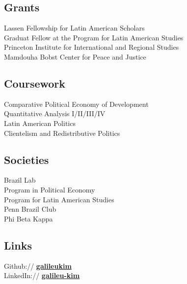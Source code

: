 \documentclass[]{deedy-resume-openfont}
\begin{document}
\begin{minipage}[t]{0.25\textwidth}

\subsection{Grants}
\textbullet{} Lassen Fellowship for Latin American Scholars\\
\textbullet{} Graduat Fellow at the Program for Latin American Studies\\
\textbullet{} Princeton Institute for International and Regional Studies\\
\textbullet{} Mamdouha Bobst Center for Peace and Justice

\sectionsep


\subsection{Coursework}
\textbullet{} Comparative Political Economy of Development\\
\textbullet{} Quantitative Analysis I/II/III/IV\\
\textbullet{} Latin American Politics\\
\textbullet{} Clientelism and Redistributive Politics

\sectionsep


\subsection{Societies}
\textbullet{} Brazil Lab\\
\textbullet{} Program in Political Economy\\
\textbullet{} Program for Latin American Studies\\
\textbullet{} Penn Brazil Club\\
\textbullet{} Phi Beta Kappa
\sectionsep


\subsection{Links}
Github:// \href{https://github.com/galileukim}{\bf galileukim} \\
LinkedIn://  \href{https://www.linkedin.com/in/leu-kim}{\bf galileu-kim} \\
\sectionsep

\end{minipage} 
\end{document}
